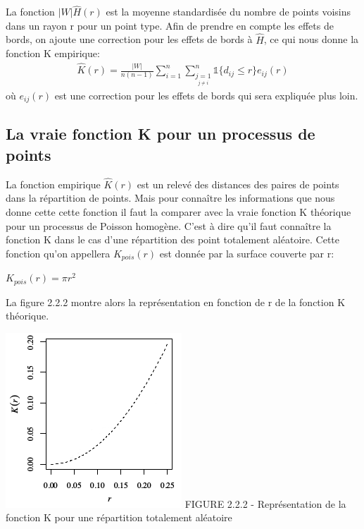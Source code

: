 \documentclass[french,12pt,a4paper]{report}
\begin{document}
La fonction \begin{math}|W|\hat{H}(r)\end{math} est la moyenne standardisée du nombre de points voisins dans un rayon r pour un point type. Afin de prendre en compte les effets de bords, on ajoute une correction pour les effets de bords à \begin{math}\hat{H}\end{math}, ce qui nous donne la fonction K empirique:
\begin{align*}
\hat{K}(r) = \frac{|W|}{n(n-1)} \sum_{i=1}^n \sum_{\underset{j \neq i}{j=1}}^n \mathds{1} \{d_{ij} \leq r \} e_{ij}(r)
\end{align*}
où \begin{math}e_{ij}(r)\end{math} est une correction pour les effets de bords qui sera expliquée plus loin.\\


\subsection{La vraie fonction K pour un processus de points}

\begin{minipage}{0.45\linewidth}
La fonction empirique \begin{math}\hat{K}(r)\end{math} est un relevé des distances des paires de points dans la répartition de points. Mais pour connaître les informations que nous donne cette cette fonction il faut la comparer avec la vraie fonction K théorique pour un processus de Poisson homogène. C'est à dire qu'il faut connaître la fonction K dans le cas d'une répartition des point totalement aléatoire. Cette fonction qu'on appellera \begin{math}K_{pois}(r)\end{math} est donnée par la surface couverte par r:
\begin{center}\begin{math} K_{pois}(r) = \pi r^2 \end{math}\end{center}
La figure 2.2.2 montre alors la représentation en fonction de r de la fonction K théorique.
\end{minipage}\hfill
\begin{minipage}{0.45\linewidth}
\includegraphics[scale=0.9]{images/Kpoiss.png}
\small{FIGURE 2.2.2 - Représentation de la fonction K pour une répartition totalement aléatoire}
\end{minipage}
\end{document}
